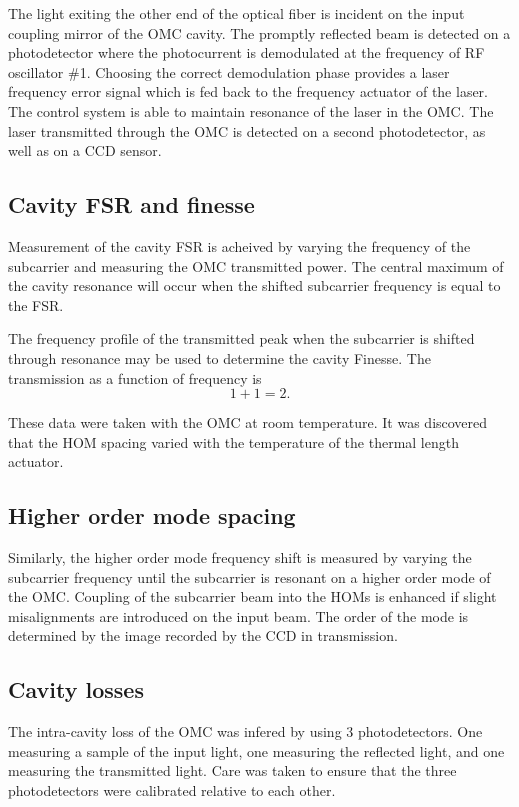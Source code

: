 The light exiting the other end of the optical fiber is incident on the input coupling mirror of the OMC cavity. %
The promptly reflected beam is detected on a photodetector where the photocurrent is demodulated at the frequency of RF oscillator \#1. %
Choosing the correct demodulation phase provides a laser frequency error signal which is fed back to the frequency actuator of the laser. %
The control system is able to maintain resonance of the laser in the OMC. %
The laser transmitted through the OMC is detected on a second photodetector, as well as on a CCD sensor.

\subsection{Cavity FSR and finesse}
Measurement of the cavity FSR is acheived by varying the frequency of the subcarrier and measuring the OMC transmitted power. %
The central maximum of the cavity resonance will occur when the shifted subcarrier frequency is equal to the FSR.

The frequency profile of the transmitted peak when the subcarrier is shifted through resonance may be used to determine the cavity Finesse. %
The transmission as a function of frequency is
\begin{equation}
1+1=2.
\end{equation}


These data were taken with the OMC at room temperature. %
It was discovered that the HOM spacing varied with the temperature of the thermal length actuator. %

\subsection{Higher order mode spacing}
Similarly, the higher order mode frequency shift is measured by varying the subcarrier frequency until the subcarrier is resonant on a higher order mode of the OMC. %
Coupling of the subcarrier beam into the HOMs is enhanced if slight misalignments are introduced on the input beam. %
The order of the mode is determined by the image recorded by the CCD in transmission.

\subsection{Cavity losses}
The intra-cavity loss of the OMC was infered by using 3 photodetectors. %
One measuring a sample of the input light, one measuring the reflected light, and one measuring the transmitted light. %
Care was taken to ensure that the three photodetectors were calibrated relative to each other.

